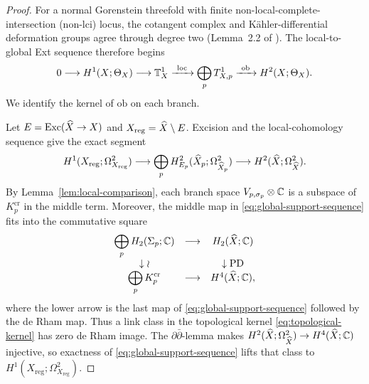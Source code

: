 \begin{proof}
For a normal Gorenstein threefold with finite
non-local-complete-intersection (non-lci) locus, the cotangent
complex and Kähler-differential deformation groups agree through degree two
(Lemma~2.2 of \cite{Wuebben:2026smoothing}).
The local-to-global Ext sequence therefore begins
\begin{equation}
 0\longrightarrow H^1(X;\Theta_X)\longrightarrow\mathbb T^1_X
 \xrightarrow{\ \operatorname{loc}\ }\bigoplus_pT^1_{X,p}
 \xrightarrow{\ \mathrm{ob}\ }H^2(X;\Theta_X).
 \label{eq:local-to-global-ext}
\end{equation}
We identify the kernel of $\mathrm{ob}$ on each branch.

Let $E=\operatorname{Exc}(\widehat X\to X)$ and
$X_{\mathrm{reg}}=\widehat X\setminus E$. Excision and the local-cohomology
sequence give the exact segment
\begin{equation}
 H^1(X_{\mathrm{reg}};\Omega^2_{X_{\mathrm{reg}}})\longrightarrow
 \bigoplus_p H^2_{E_p}(\widehat X_p;\Omega^2_{\widehat X_p})
 \longrightarrow H^2(\widehat X;\Omega^2_{\widehat X}).
 \label{eq:global-support-sequence}
\end{equation}
By Lemma~\ref{lem:local-comparison}, each branch space
$V_{p,\sigma_p}\otimes\mathbb C$ is a subspace of $K_p^{\mathrm{cr}}$ in the
middle term. Moreover, the middle map in
\eqref{eq:global-support-sequence} fits into the commutative square
\begin{equation}
\begin{array}{ccc}
 \displaystyle\bigoplus_pH_2(\Sigma_p;\mathbb C)&\longrightarrow&H_2(\widehat X;\mathbb C)\\
 \downarrow\wr&&\downarrow\operatorname{PD}\\
 \displaystyle\bigoplus_pK_p^{\mathrm{cr}}&\longrightarrow&H^4(\widehat X;\mathbb C),
\end{array}
 \label{eq:gysin-comparison-square}
\end{equation}
where the lower arrow is the last map of
\eqref{eq:global-support-sequence} followed by the de Rham map. Thus a link
class in the topological kernel \eqref{eq:topological-kernel} has zero de
Rham image. The $\partial\bar\partial$-lemma makes
$H^2(\widehat X;\Omega^2_{\widehat X})\to H^4(\widehat X;\mathbb C)$ injective, so exactness of
\eqref{eq:global-support-sequence} lifts that class to
$H^1(X_{\mathrm{reg}};\Omega^2_{X_{\mathrm{reg}}})$.


\end{proof}

